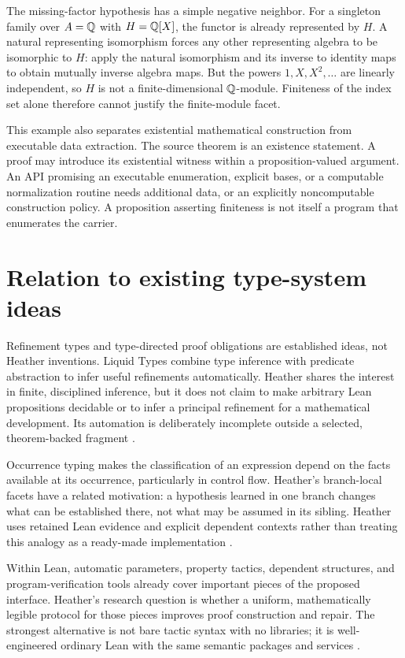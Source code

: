 \documentclass[11pt,letterpaper]{article}
\theoremstyle{definition}\newtheorem{definition}[theorem]{Definition}
\theoremstyle{remark}\newtheorem{remark}[theorem]{Remark}
\begin{document}
The missing-factor hypothesis has a simple negative neighbor. For a singleton
family over $A=\mathbb Q$ with $H=\mathbb Q[X]$, the functor is already represented by $H$.
A natural representing isomorphism forces any other representing algebra to
be isomorphic to $H$: apply the natural isomorphism and its inverse to identity
maps to obtain mutually inverse algebra maps. But the powers
$1,X,X^2,\ldots$ are linearly independent, so $H$ is not a finite-dimensional
$\mathbb Q$-module. Finiteness of the index set alone therefore cannot justify the
finite-module facet.

This example also separates existential mathematical construction from
executable data extraction. The source theorem is an existence statement.
A proof may introduce its existential witness within a proposition-valued
argument. An API promising an executable enumeration, explicit bases, or a
computable normalization routine needs additional data, or an explicitly
noncomputable construction policy. A proposition asserting finiteness is not
itself a program that enumerates the carrier.

\section{Relation to existing type-system ideas}

Refinement types and type-directed proof obligations are established ideas,
not Heather inventions. Liquid Types combine type inference with predicate
abstraction to infer useful refinements automatically. Heather shares the
interest in finite, disciplined inference, but it does not claim to make
arbitrary Lean propositions decidable or to infer a principal refinement for
a mathematical development. Its automation is deliberately incomplete outside
a selected, theorem-backed fragment \cite{liquid}.

Occurrence typing makes the classification of an expression depend on the
facts available at its occurrence, particularly in control flow. Heather's
branch-local facets have a related motivation: a hypothesis learned in one
branch changes what can be established there, not what may be assumed in its
sibling. Heather uses retained Lean evidence and explicit dependent contexts
rather than treating this analogy as a ready-made implementation
\cite{occurrence}.

Within Lean, automatic parameters, property tactics, dependent structures, and
program-verification tools already cover important pieces of the proposed
interface. Heather's research question is whether a uniform, mathematically
legible protocol for those pieces improves proof construction and repair.
The strongest alternative is not bare tactic syntax with no libraries; it is
well-engineered ordinary Lean with the same semantic packages and services
\cite{lean-application,funprop,mvcgen}.
\end{document}
